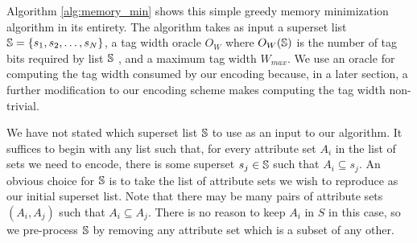 Algorithm \ref{alg:memory_min} shows this simple greedy memory minimization
algorithm in its entirety. The algorithm takes as input a superset list $\mathbb{S} =
\{s_1, s_2, \dots, s_N\}$, a tag width oracle $O_W$ where $O_W(\mathbb{S})$ is the
number of tag bits required by list $\mathbb{S}$ , and a maximum tag width $W_{max}$.
We use an oracle for computing the tag width consumed by our encoding because,
in a later section, a further modification to our encoding scheme makes
computing the tag width non-trivial. 

We have not stated which superset list $\mathbb{S}$ to use as an input to our
algorithm. It suffices to begin with any list such that, for every attribute set
$A_i$ in the list of sets we need to encode, there is some superset $s_j \in
\mathbb{S}$ such that $A_i \subseteq s_j$. An obvious choice for $\mathbb{S}$ is to take the
list of attribute sets we wish to reproduce as our initial superset list. Note
that there may be many pairs of attribute sets $(A_i, A_j)$ such that $A_i
\subseteq A_j$. There is no reason to keep $A_i$ in $S$ in this case, so we
pre-process $\mathbb{S}$ by removing any attribute set which is a subset of any other. 